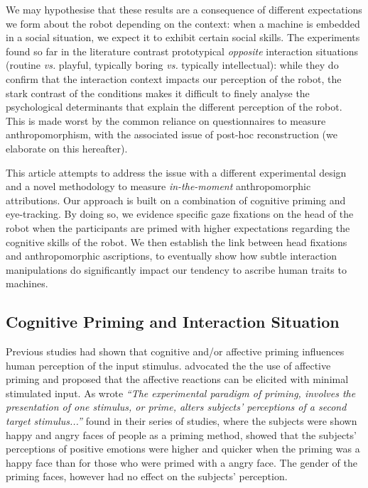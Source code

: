 \documentclass[lettersize, noapacite, twoside, HRI]{apa_HRI}
\newcommand{\vs}{\textit{vs.}\xspace}
\begin{document}
We may hypothesise that these results are a consequence of different
expectations we form about the robot depending on the context: when a machine is
embedded in a social situation, we expect it to exhibit certain
social skills. The experiments found so far in the literature contrast prototypical
\emph{opposite} interaction situations (routine \vs playful, typically boring \vs typically
intellectual): while they do confirm that the interaction context impacts our
perception of the robot, the stark contrast of the conditions makes it difficult
to finely analyse the psychological determinants that explain the different
perception of the robot. This is made worst by the common reliance on
questionnaires to measure anthropomorphism, with the associated issue of
post-hoc reconstruction (we elaborate on this hereafter).

This article attempts to address the issue with a different experimental design
and a novel methodology to measure \emph{in-the-moment} anthropomorphic
attributions.  Our approach is built on a combination of cognitive priming and
eye-tracking. By doing so, we evidence specific gaze fixations on the head
of the robot when the participants are primed with higher expectations
regarding the cognitive skills of the robot. We then establish the link
between head fixations and anthropomorphic ascriptions, to eventually show how
subtle interaction manipulations do significantly impact our tendency
to ascribe human traits to machines.



\subsection{Cognitive Priming and Interaction Situation}

Previous studies had shown that cognitive and/or affective priming influences
human perception of the input stimulus. \cite{zajonc1980feeling} advocated the
the use of affective priming and proposed that the affective reactions can be
elicited with minimal stimulated input. As \cite{murphy1993affect} wrote
\textit{``The experimental paradigm of priming, involves the presentation of one
stimulus, or prime, alters subjects' perceptions of a second target
stimulus...''}  \cite{murphy1993affect} found in their series of studies, where
the subjects were shown happy and angry faces of people as a priming method,
showed that the subjects' perceptions of positive emotions were higher and
quicker when the priming was a happy face than for those who were primed with a
angry face. The gender of the priming faces, however had no effect on the
subjects' perception.
\end{document}
